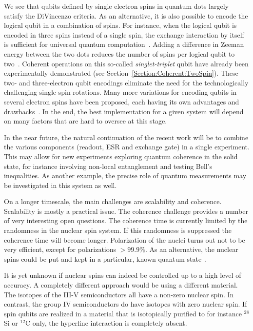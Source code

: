 \documentclass[12pt,aps,nofootinbib]{revtex4-1}
\begin{document}
We see that qubits defined by single electron spins in quantum dots largely satisfy the DiVincenzo criteria. As an alternative, it is also possible to encode the logical qubit in a combination of spins. For instance, when the logical qubit is encoded in three spins instead of 
a single spin, the exchange interaction by itself is sufficient for universal quantum computation~\cite{DiVincenzoNature2000}. Adding a difference in Zeeman energy between the two dots reduces the number of spins per logical qubit to two~\cite{Levy}. Coherent operations on this so-called \textit{singlet-triplet} qubit have already been experimentally demonstrated (see Section~\ref{Section:Coherent:TwoSpin}). These two- and three-electron qubit encodings eliminate the need for the technologically challenging single-spin rotations. Many more variations for encoding qubits in several electron spins have been proposed, each having its own advantages and drawbacks~\cite{wulidar02a, wulidar02b,ByrdLidar,Meier,Kyriakidis2005,TaylerNaturePhysics2005,hanson06}. In the end, the best implementation for a given system will depend on many factors that are hard to oversee at this stage.

In the near future, the natural continuation of the recent work will be to combine the various components (readout, ESR and exchange gate) in a single experiment. This may allow for new experiments exploring quantum coherence in the solid state, for instance involving non-local entanglement and testing Bell's inequalities. As another example, the precise role of quantum measurements may be investigated in this system as well.

On a longer timescale, the main challenges are scalability and coherence. Scalability is mostly a practical issue. The coherence challenge provides a number of very interesting open questions. The coherence time is currently limited by the randomness in the nuclear spin system. If this randomness is 
suppressed the coherence time will become longer. Polarization of the nuclei turns out not to be very efficient, except for polarizations $> 99.9\%$. As an alternative, the nuclear spins could be put and kept in a particular, known quantum state~\cite{giedke06,klauser06,stepanenko06}. %

It is yet unknown if nuclear spins can indeed be controlled up to
a high level of accuracy. A completely different approach would be
using a different material. The isotopes of the III-V
semiconductors all have a non-zero nuclear spin. In contrast, the
group IV semiconductors do have isotopes with zero nuclear spin.
If spin qubits are realized in a material that is isotopically
purified to for instance $^{28}$Si or $^{12}$C only, the hyperfine interaction is completely absent.
\end{document}
